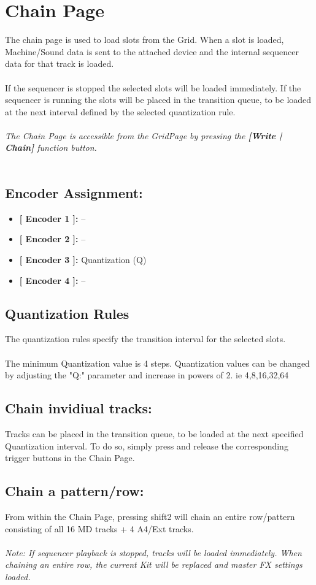 \chapter{Chain Page}
The chain page is used to load slots from the Grid. When a slot is loaded, Machine/Sound data is sent to the attached device and the internal sequencer data for that track is loaded.\\
\\
If the sequencer is stopped the selected slots will be loaded immediately. If the sequencer is running the slots will be placed in the transition queue, to be loaded at the next interval defined by the selected quantization rule.\\
\\
\textit{The Chain Page is accessible from the GridPage by pressing the  \textbf{[Write | Chain]} function button.}
\\\\
\section{Encoder Assignment:}

\begin{itemize}
	\item \textbf{[ Encoder 1 ]: } --
	\item \textbf{[ Encoder 2 ]: } --
	\item \textbf{[ Encoder 3 ]: } Quantization (Q)
	\item \textbf{[ Encoder 4 ]: }--
\end{itemize}
\section{Quantization Rules}
The quantization rules specify the transition interval for the selected slots.\\
\\
The minimum Quantization value is 4 steps. Quantization values can be changed by adjusting the "Q:" parameter and increase in powers of 2. ie 4,8,16,32,64
\section{Chain invidiual tracks:}
Tracks can be placed in the transition queue, to be loaded at the next specified Quantization interval. To do so, simply press and release the corresponding trigger buttons in the Chain Page.
\section{Chain a pattern/row:}
From within the Chain Page, pressing shift2 will chain an entire row/pattern consisting of all 16 MD tracks + 4 A4/Ext tracks.\\
\\
\textit{Note: If sequencer playback is stopped, tracks will be loaded immediately. When chaining an entire row, the current Kit will be replaced and master FX settings loaded.}